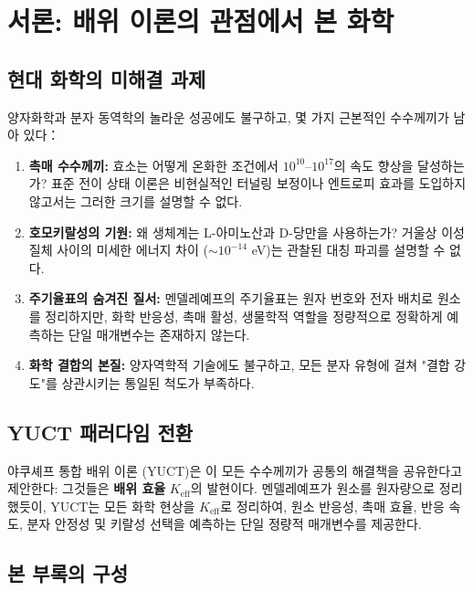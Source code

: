 \documentclass[12pt,a4paper]{article}
\newcommand{\Keff}{K_{\mathrm{eff}}}
\begin{document}
	\tableofcontents
	\newpage
	
	\section{서론: 배위 이론의 관점에서 본 화학}
	\label{sec:intro}
	
	\subsection{현대 화학의 미해결 과제}
	
	양자화학과 분자 동역학의 놀라운 성공에도 불구하고, 몇 가지 근본적인 수수께끼가 남아 있다：
	
	\begin{enumerate}
		\item \textbf{촉매 수수께끼:} 효소는 어떻게 온화한 조건에서 $10^{10}$--$10^{17}$의 속도 향상을 달성하는가? 표준 전이 상태 이론은 비현실적인 터널링 보정이나 엔트로피 효과를 도입하지 않고서는 그러한 크기를 설명할 수 없다.
		\item \textbf{호모키랄성의 기원:} 왜 생체계는 L-아미노산과 D-당만을 사용하는가? 거울상 이성질체 사이의 미세한 에너지 차이 ($\sim 10^{-14}$ eV)는 관찰된 대칭 파괴를 설명할 수 없다.
		\item \textbf{주기율표의 숨겨진 질서:} 멘델레예프의 주기율표는 원자 번호와 전자 배치로 원소를 정리하지만, 화학 반응성, 촉매 활성, 생물학적 역할을 정량적으로 정확하게 예측하는 단일 매개변수는 존재하지 않는다.
		\item \textbf{화학 결합의 본질:} 양자역학적 기술에도 불구하고, 모든 분자 유형에 걸쳐 "결합 강도"를 상관시키는 통일된 척도가 부족하다.
	\end{enumerate}
	
	\subsection{YUCT 패러다임 전환}
	
	야쿠셰프 통합 배위 이론 (YUCT)은 이 모든 수수께끼가 공통의 해결책을 공유한다고 제안한다: 그것들은 \textbf{배위 효율} $\Keff$의 발현이다. 멘델레예프가 원소를 원자량으로 정리했듯이, YUCT는 모든 화학 현상을 $\Keff$로 정리하여, 원소 반응성, 촉매 효율, 반응 속도, 분자 안정성 및 키랄성 선택을 예측하는 단일 정량적 매개변수를 제공한다.
	
	\subsection{본 부록의 구성}
	
\end{document}
